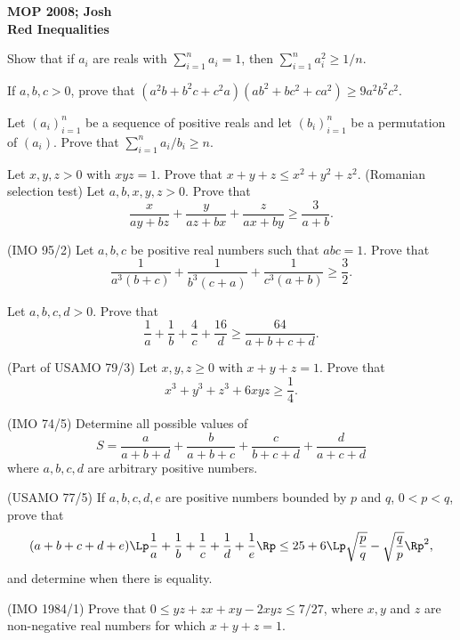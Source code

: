 \documentclass[11pt]{article}
\begin{document}
{\bf \noindent MOP 2008; Josh \\ Red Inequalities}

\be \ii Show that if $a_i$ are reals with $\sum_{i=1}^n a_i = 1$,
then $\sum_{i=1}^n a_i^2 \geq 1/n.$

\ii If $a,b,c>0$, prove that $(a^2b+b^2c+c^2a)(ab^2+bc^2+ca^2)\geq
9a^2b^2c^2.$

\ii Let $(a_i)_{i=1}^n$ be a sequence of positive reals and let
$(b_i)_{i=1}^n$ be a permutation of $(a_i)$. Prove that
$\sum_{i=1}^n a_i/b_i \geq n$.

\ii Let $x,y,z>0$ with $xyz=1$.  Prove that $x+y+z\leq
x^2+y^2+z^2$.
\ii (Romanian selection test) Let $a,b,x,y,z>0$. Prove that
\[\frac x{ay+bz}+\frac y{az+bx} + \frac z{ax+by} \geq \frac 3{a+b}.\]

\ii (IMO 95/2) Let $a, b, c$ be positive real numbers such that
$abc = 1$. Prove that
\[
\frac{1}{a^3(b+c)} + \frac{1}{b^3(c+a)} + \frac{1}{c^3(a+b)}
\geq\frac{3}{2}.
\]

\ii Let $a,b,c,d>0$.  Prove that
\[\frac{1}{a}+\frac{1}{b}+\frac{4}{c} + \frac{16}{d}\geq\frac{64}{a+b+c+d}.\]

\ii (Part of USAMO 79/3) Let $x,y,z\geq 0$ with $x+y+z=1$.  Prove
that
\[x^3+y^3+z^3+6xyz\geq \frac14.\]

\ii (IMO 74/5) Determine all possible values of
\[ S= \frac{a}{a+b+d} +\frac{b}{a + b+c} + \frac{c}{b+c+d} +\frac{d}{a+c+d}\]
where $a,b,c,d$ are arbitrary positive numbers.

\ii (USAMO 77/5) If $a,b,c,d,e$ are positive numbers bounded by
$p$ and $q$, $0<p<q$, prove that
\[(a+b+c+d+e)\Lp\frac{1}{a}+\frac{1}{b}+\frac{1}{c}+\frac{1}{d}+\frac{1}{e}\Rp \leq 25+6\Lp\sqrt{\frac{p}{q}}-\sqrt{\frac{q}{p}}\Rp^2,\] and
determine when there is equality.

\ii (IMO 1984/1) Prove that $0\leq yz+zx+xy-2xyz\leq 7/27$, where
$x,y$ and $z$ are non-negative real numbers for which $x+y+z=1$.

\ee
\end{document}
